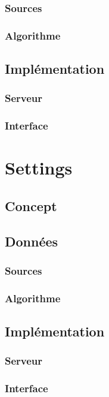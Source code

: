 		\subsubsection{Sources}

		\subsubsection{Algorithme}

	\subsection{Implémentation}

		\subsubsection{Serveur}

		\subsubsection{Interface}

\section{Settings}

	\subsection{Concept}

	\subsection{Données}

		\subsubsection{Sources}

		\subsubsection{Algorithme}

	\subsection{Implémentation}

		\subsubsection{Serveur}

		\subsubsection{Interface}